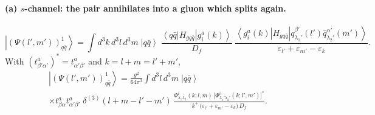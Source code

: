 \documentclass[11pt,a4paper]{article}
\numberwithin{equation}{section}
\newcommand{\eps}{\varepsilon}
\newcommand{\dthree}{\delta^{(3)}}
\newcommand{\ket}[1]{\left|#1\right\rangle}
\newcommand{\bra}[1]{\left\langle#1\right|}
\newcommand{\Ph}{\Phi}
\newcommand{\qk}[3]{q^{#1}_{#2}(#3)}
\newcommand{\aqk}[3]{\bar q^{#1}_{#2}(#3)}
\newcommand{\gl}[3]{g^{#1}_{#2}(#3)}
\begin{document}
\paragraph{(a) $s$-channel: the pair annihilates into a gluon which splits again.}
\begin{center}
\end{center}
\begin{equation}
\ket{(\Psi(l',m'))^{1}_{q\bar q}}=\int\! d^{3}k\,d^{3}l\,d^{3}m\;\ket{q\bar q}\;
\frac{\bra{q\bar q}H_{gq\bar q}\ket{\gl{a}{i}{k}}}{D_{f}}\;
\frac{\bra{\gl{a}{i}{k}}H_{gq\bar q}\ket{\qk{\beta'}{\lambda_{1}'}{l'}\aqk{\alpha'}{\lambda_{2}'}{m'}}}
{\eps_{l'}+\eps_{m'}-\eps_{k}} .
\end{equation}
With $(t^{a}_{\beta'\alpha'})^{*}=t^{a}_{\alpha'\beta'}$ and $k=l+m=l'+m'$,
\begin{multline}
\ket{(\Psi(l',m'))^{1}_{q\bar q}}=\frac{g^{2}}{64\pi^{3}}\int\!d^{3}l\,d^{3}m\;\ket{q\bar q}\;
\\
\times t^{a}_{\beta\alpha}t^{a}_{\alpha'\beta'}\;\dthree(l+m-l'-m')\,
\frac{\Ph^{i}_{\lambda_{1}\lambda_{2}}(k;l,m)\,
\big[\Ph^{i}_{\lambda_{1}'\lambda_{2}'}(k;l',m')\big]^{*}}
{k^{+}\,\big(\eps_{l'}+\eps_{m'}-\eps_{k}\big)\,D_{f}} .
\label{eq:D3a}
\end{multline}
\end{document}
